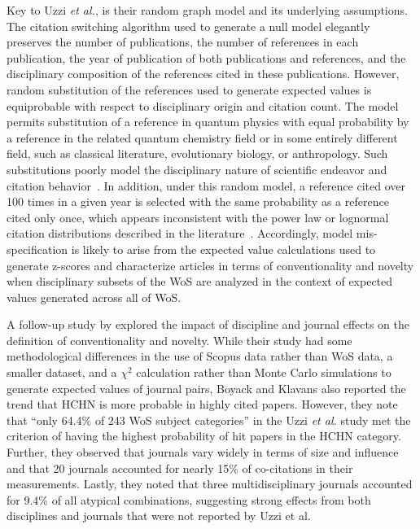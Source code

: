 \documentclass[NETN]{stjour}
\begin{document}
Key to Uzzi {\em et al.}, is their random graph model and its underlying assumptions. The citation switching algorithm used to generate a null model elegantly preserves the number of publications, the number of references in each publication, the year of publication of both publications and references, and the disciplinary composition of the references cited in these publications. However, random substitution of the references used to generate expected values is equiprobable with respect to disciplinary origin and citation count. The model permits substitution of a reference in quantum physics with equal probability by a reference in the related quantum chemistry field or in some entirely different field, such as classical literature, evolutionary biology, or anthropology. Such substitutions poorly model the disciplinary nature of scientific endeavor and citation behavior~\citep{wallace_lariviere_gingras_2012,moed_measuring_2010,klavans_research_2017,garfield_1979}. In addition, under this random model, a reference cited over 100 times in a given year is selected with the same probability as a reference cited only once, which appears inconsistent with the power law or lognormal citation distributions described in the literature~\citep{stringer_statistical_2010,perline_strong_2005}.  Accordingly, model mis-specification is likely to arise from the expected value calculations used to generate z-scores and characterize articles in terms of conventionality and novelty when disciplinary subsets of the WoS are analyzed in the context of expected values generated across all of WoS.

A follow-up study by \citep{boyack_vs_uzzi_2014} explored the impact of discipline and journal effects on the definition of conventionality and novelty.  While their study had some methodological differences in the use of Scopus data rather than WoS data, a smaller dataset, and a $\chi^2$ calculation rather than Monte Carlo simulations to generate expected values of journal pairs, Boyack and Klavans also reported the trend that HCHN is more probable in highly cited papers. However, they note that ``only 64.4\%  of  243  WoS  subject  categories'' in the Uzzi {\em et al.} study met the criterion of having the highest probability of hit papers in the HCHN category.  Further, they observed that journals vary widely in terms of size and influence and that 20 journals accounted for nearly 15\% of co-citations in their measurements. Lastly, they noted that three multidisciplinary journals accounted for 9.4\% of all atypical combinations, suggesting strong effects from both disciplines and journals that were not reported by Uzzi et al. 
\end{document}
